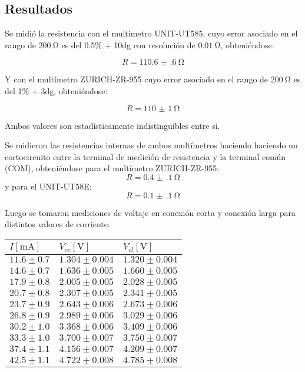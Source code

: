 \documentclass[12pt,a4paper]{article}
\begin{document}
\subsection*{Resultados}

Se midió la resistencia con el multímetro UNIT-UT585, cuyo error asociado en el rango de $\SI{200}{\ohm}$ es del 0.5\% + 10dg con resolución de $\SI{0.01}{\ohm}$, obteniéndose:

$$R = \SI{110.6(6)}{\ohm}$$

Y con el multímetro ZURICH-ZR-955 cuyo error asociado en el rango de $\SI{200}{\ohm}$ es del 1\% + 3dg, obteniéndose:

$$R = \SI{110(1)}{\ohm}$$

Ambos valores son estad\'isticamente indistinguibles entre si.

Se midieron las resistencias internas de ambos multímetros haciendo haciendo un cortocircuito entre la terminal de medición de resistencia y la terminal común (COM), obteniéndose para el multímetro ZURICH-ZR-955: $$R = \SI{0.4(1)}{\ohm}$$
y para el UNIT-UT58E: $$R = \SI{0.1(1)}{\ohm}$$

Luego se tomaron mediciones de voltaje en conexión corta y conexión larga para distintos valores de corriente: 

 \begin{table}[H]
\centering
\begin{tabular}{|l|l|l|}

$I [\si\milli\si\ampere]$ &  $V_{cc} [\si\volt]$ & $V_{cl} [\si\volt]$ \\
                \hline

$ 11.6 \pm 0.7 $ & $ 1.304 \pm 0.004 $ & $ 1.320 \pm 0.004 $ \\ 
$ 14.6 \pm 0.7 $ & $ 1.636 \pm 0.005 $ & $ 1.660 \pm 0.005 $ \\ 
$ 17.9 \pm 0.8 $ & $ 2.005 \pm 0.005 $ & $ 2.028 \pm 0.005 $ \\ 
$ 20.7 \pm 0.8 $ & $ 2.307 \pm 0.005 $ & $ 2.341 \pm 0.005 $ \\ 
$ 23.7 \pm 0.9 $ & $ 2.643 \pm 0.006 $ & $ 2.673 \pm 0.006 $ \\ 
$ 26.8 \pm 0.9 $ & $ 2.989 \pm 0.006 $ & $ 3.029 \pm 0.006 $ \\ 
$ 30.2 \pm 1.0 $ & $ 3.368 \pm 0.006 $ & $ 3.409 \pm 0.006 $ \\ 
$ 33.3 \pm 1.0 $ & $ 3.700 \pm 0.007 $ & $ 3.750 \pm 0.007 $ \\ 
$ 37.4 \pm 1.1 $ & $ 4.156 \pm 0.007 $ & $ 4.209 \pm 0.007 $ \\ 
$ 42.5 \pm 1.1 $ & $ 4.722 \pm 0.008 $ & $ 4.785 \pm 0.008 $ \\ 

\end{tabular}
\end{table}
\end{document}
